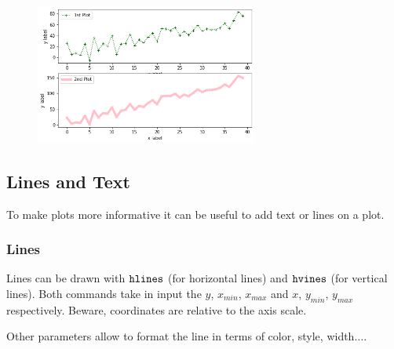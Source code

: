 \begin{figure}[h]
	\centering
	\includegraphics[width=0.65\textwidth]{figures/matplotlib_27_0.png}
\end{figure}

\subsection{Lines and Text}\label{lines-and-text}

To make plots more informative it can be useful to add text or lines on
a plot.

\subsubsection{Lines}\label{lines}

Lines can be drawn with \(\tt{hlines}\) (for horizontal lines) and
\(\tt{hvines}\) (for vertical lines). Both commands take in input the
\(y\), \(x_{min}\), \(x_{max}\) and \(x\), \(y_{min}\), \(y_{max}\)
respectively. Beware, coordinates are relative to the axis scale.

Other parameters allow to format the line in terms of color, style,
width\(\ldots\).

